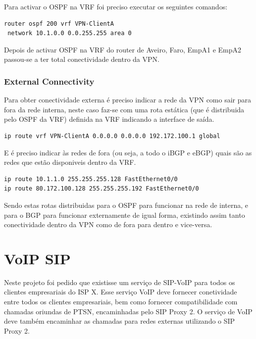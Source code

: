 \documentclass[11pt,a4paper]{report}
\begin{document}
Para activar o OSPF na VRF foi preciso executar os seguintes comandos:\\

\begin{lstlisting}[caption=VPN - Suporte de OSPF entre o PE e o CE]
router ospf 200 vrf VPN-ClientA
 network 10.1.0.0 0.0.255.255 area 0
\end{lstlisting}

Depois de activar OSPF na VRF do router de Aveiro, Faro, EmpA1 e EmpA2 passou-se a ter total conectividade dentro da VPN.

\subsection{External Connectivity}

Para obter conectividade externa é preciso indicar a rede da VPN como sair para fora da rede interna, neste caso faz-se com uma rota estática (que é distribuida pelo OSPF da VRF) definida na VRF indicando a interface de saída.\\

\begin{lstlisting}[caption=VPN - Rota de saída da VPN-ClientA]
ip route vrf VPN-ClientA 0.0.0.0 0.0.0.0 192.172.100.1 global
\end{lstlisting}

E é preciso indicar às redes de fora (ou seja, a todo o iBGP e eBGP) quais são as redes que estão disponiveis dentro da VRF.\\

\begin{lstlisting}[caption=VPN - Anunciar rotas disponiveis dentro da VPN do lado de Aveiro]
ip route 10.1.1.0 255.255.255.128 FastEthernet0/0
ip route 80.172.100.128 255.255.255.192 FastEthernet0/0
\end{lstlisting}

Sendo estas rotas distribuidas para o OSPF para funcionar na rede de interna, e para o BGP para funcionar externamente de igual forma, existindo assim tanto conectividade dentro da VPN como de fora para dentro e vice-versa.

\chapter{VoIP SIP}

Neste projeto foi pedido que existisse um serviço de SIP-VoIP para todos os clientes empresariais do ISP X. Esse serviço VoIP deve fornecer conetividade entre todos os clientes empresariais, bem como fornecer compatibilidade com chamadas oriundas de PTSN, encaminhadas pelo SIP Proxy 2. O serviço de VoIP deve também encaminhar as chamadas para redes externas utilizando o SIP Proxy 2.
\end{document}
